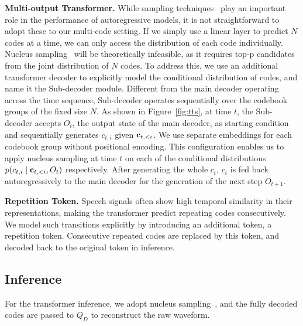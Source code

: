 \documentclass[letterpaper]{article}
\begin{document}
\textbf{Multi-output Transformer.}
While sampling techniques~\cite{Holtzman2020The,fan-etal-2018-hierarchical} play an important role in the performance of autoregressive models, it is not straightforward to adopt these to our multi-code setting.
If we simply use a linear layer to predict $N$ codes at a time, we can only access the distribution of each code individually.
Nucleus sampling~\cite{Holtzman2020The} will be theoretically infeasible, as it requires top-p candidates from the joint distribution of $N$ codes.
To address this, we use an additional transformer decoder to explicitly model the conditional distribution of codes, and name it the Sub-decoder module.
Different from the main decoder operating across the time sequence, Sub-decoder operates sequentially over the codebook groups of the fixed size $N$.
As shown in Figure~\ref{fig:tts}, at time $t$, the Sub-decoder accepts $O_{t}$, the output state of the main decoder, as starting condition and sequentially generates $c_{t,i}$ given $\vb{c}_{t,<i}$.
We use separate embeddings for each codebook group without positional encoding.
This configuration enables us to apply nucleus sampling at time $t$ on each of the conditional distributions $p(c_{t,i}\mid \vb{c}_{t,<i}, O_{t})$ respectively.
After generating the whole $c_t$, $c_t$ is fed back autoregressively to the main decoder for the generation of the next step $O_{t+1}$.

\textbf{Repetition Token.}
Speech signals often show high temporal similarity in their representations, making the transformer predict repeating codes consecutively.
We model such transitions explicitly by introducing an additional token, a repetition token.
Consecutive repeated codes are replaced by this token, and decoded back to the original token in inference.

\subsection{Inference}
\label{ssec:inf}
For the transformer inference, we adopt nucleus sampling~\cite{Holtzman2020The}, and the fully decoded codes are passed to $Q_D$ to reconstruct the raw waveform.
\end{document}
